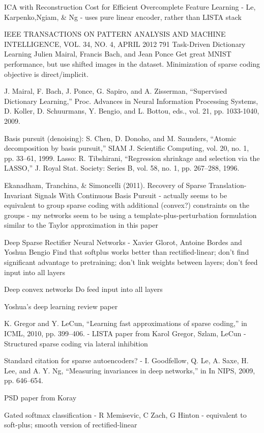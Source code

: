 ICA with Reconstruction Cost for Efficient Overcomplete Feature Learning - Le, Karpenko,Ngiam, \& Ng - uses pure linear encoder, rather than LISTA stack

IEEE TRANSACTIONS ON PATTERN ANALYSIS AND MACHINE INTELLIGENCE, VOL. 34, NO. 4, APRIL 2012 791
Task-Driven Dictionary Learning Julien Mairal, Francis Bach, and Jean Ponce
Get great MNIST performance, but use shifted images in the dataset.  Minimization of sparse coding objective is direct/implicit.

J. Mairal, F. Bach, J. Ponce, G. Sapiro, and A. Zisserman, “Supervised Dictionary Learning,” Proc. Advances in Neural Information Processing Systems, D. Koller, D. Schuurmans, Y. Bengio, and L. Bottou, eds., vol. 21, pp. 1033-1040, 2009.

Basis pursuit (denoising): S. Chen, D. Donoho, and M. Saunders, “Atomic decomposition by basis pursuit,” SIAM J. Scientific Computing, vol. 20, no. 1, pp. 33–61, 1999.
Lasso: R. Tibshirani, “Regression shrinkage and selection via the LASSO,” J. Royal Stat. Society: Series B, vol. 58, no. 1, pp. 267–288, 1996.

Ekanadham, Tranchina, \& Simoncelli (2011). Recovery of Sparse Translation-Invariant Signals With Continuous Basis Pursuit  - actually seems to be equivalent to group sparse coding with additional (convex?) constraints on the groups - my networks seem to be using a template-plus-perturbation formulation similar to the Taylor approximation in this paper



Deep Sparse Rectifier Neural Networks - Xavier Glorot, Antoine Bordes and Yoshua Bengio
Find that softplus works better than rectified-linear; don't find significant advantage to pretraining; don't link weights between layers; don't feed input into all layers

Deep convex networks
Do feed input into all layers

Yoshua's deep learning review paper

K. Gregor and Y. LeCun, “Learning fast approximations of sparse coding,” in ICML, 2010, pp. 399–406. - LISTA paper from Karol
Gregor, Szlam, LeCun - Structured sparse coding via lateral inhibition


Standard citation for sparse autoencoders? - I. Goodfellow, Q. Le, A. Saxe, H. Lee, and A. Y. Ng, “Measuring invariances in deep networks,” in In NIPS, 2009, pp. 646–654.

PSD paper from Koray

Gated softmax classification - R Memisevic, C Zach, G Hinton - equivalent to soft-plus; smooth version of rectified-linear

